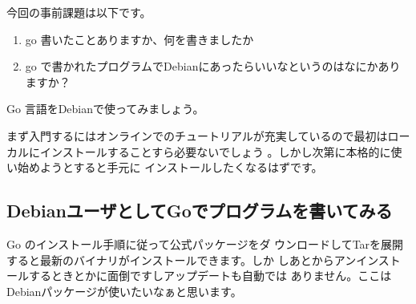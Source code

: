 \documentclass[mingoth,a4paper]{jsarticle}
\begin{document}


今回の事前課題は以下です。

\begin{enumerate}
 \item go 書いたことありますか、何を書きましたか
 \item go で書かれたプログラムでDebianにあったらいいなというのはなにかありますか？
\end{enumerate}


\begin{multicols}{2}
{\small
% 
}
\end{multicols}

%
%
%
%




Go 言語をDebianで使ってみましょう。

まず入門するにはオンラインでのチュートリアルが充実しているので最初はロー
カルにインストールすることすら必要ないでしょう\cite{golang:tourofgo}
\cite{golang:tourofgoja}。しかし次第に本格的に使い始めようとすると手元に
インストールしたくなるはずです。

\subsection{DebianユーザとしてGoでプログラムを書いてみる}

Go のインストール手順\cite{golangorg-install}に従って公式パッケージをダ
ウンロードしてTarを展開すると最新のバイナリがインストールできます。しか
しあとからアンインストールするときとかに面倒ですしアップデートも自動では
ありません。ここはDebianパッケージが使いたいなぁと思います。
\end{document}
